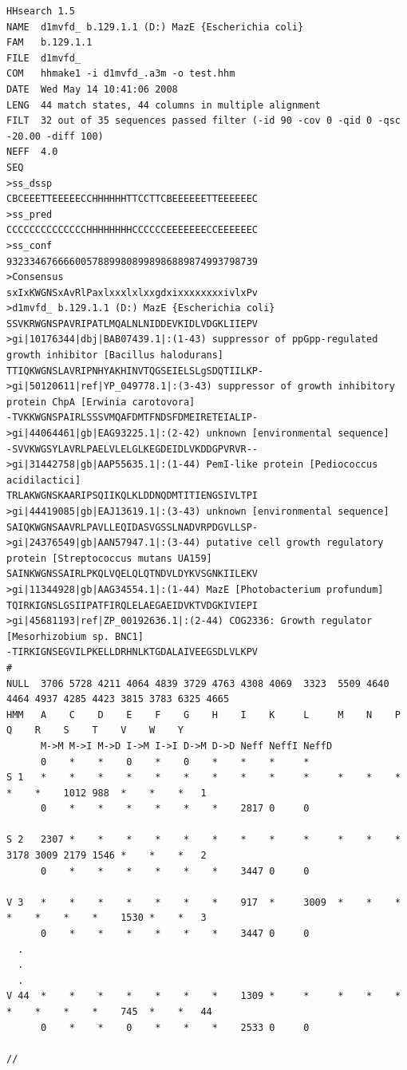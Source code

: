 \documentclass[11pt,a4paper]{article}
\begin{document}
\scriptsize
\begin{verbatim}
HHsearch 1.5
NAME  d1mvfd_ b.129.1.1 (D:) MazE {Escherichia coli}
FAM   b.129.1.1
FILE  d1mvfd_
COM   hhmake1 -i d1mvfd_.a3m -o test.hhm 
DATE  Wed May 14 10:41:06 2008
LENG  44 match states, 44 columns in multiple alignment
FILT  32 out of 35 sequences passed filter (-id 90 -cov 0 -qid 0 -qsc -20.00 -diff 100)
NEFF  4.0 
SEQ
>ss_dssp
CBCEEETTEEEEECCHHHHHHTTCCTTCBEEEEEETTEEEEEEC
>ss_pred
CCCCCCCCCCCCCCHHHHHHHHCCCCCCEEEEEEECCEEEEEEC
>ss_conf
93233467666600578899808998986889874993798739
>Consensus
sxIxKWGNSxAvRlPaxlxxxlxlxxgdxixxxxxxxxivlxPv
>d1mvfd_ b.129.1.1 (D:) MazE {Escherichia coli}
SSVKRWGNSPAVRIPATLMQALNLNIDDEVKIDLVDGKLIIEPV
>gi|10176344|dbj|BAB07439.1|:(1-43) suppressor of ppGpp-regulated growth inhibitor [Bacillus halodurans]
TTIQKWGNSLAVRIPNHYAKHINVTQGSEIELSLgSDQTIILKP-
>gi|50120611|ref|YP_049778.1|:(3-43) suppressor of growth inhibitory protein ChpA [Erwinia carotovora]
-TVKKWGNSPAIRLSSSVMQAFDMTFNDSFDMEIRETEIALIP-
>gi|44064461|gb|EAG93225.1|:(2-42) unknown [environmental sequence]
-SVVKWGSYLAVRLPAELVLELGLKEGDEIDLVKDDGPVRVR--
>gi|31442758|gb|AAP55635.1|:(1-44) PemI-like protein [Pediococcus acidilactici]
TRLAKWGNSKAARIPSQIIKQLKLDDNQDMTITIENGSIVLTPI
>gi|44419085|gb|EAJ13619.1|:(3-43) unknown [environmental sequence]
SAIQKWGNSAAVRLPAVLLEQIDASVGSSLNADVRPDGVLLSP-
>gi|24376549|gb|AAN57947.1|:(3-44) putative cell growth regulatory protein [Streptococcus mutans UA159]
SAINKWGNSSAIRLPKQLVQELQLQTNDVLDYKVSGNKIILEKV
>gi|11344928|gb|AAG34554.1|:(1-44) MazE [Photobacterium profundum]
TQIRKIGNSLGSIIPATFIRQLELAEGAEIDVKTVDGKIVIEPI
>gi|45681193|ref|ZP_00192636.1|:(2-44) COG2336: Growth regulator [Mesorhizobium sp. BNC1]
-TIRKIGNSEGVILPKELLDRHNLKTGDALAIVEEGSDLVLKPV
#
NULL  3706 5728 4211 4064 4839 3729 4763 4308 4069  3323  5509 4640 4464 4937 4285 4423 3815 3783 6325 4665
HMM   A    C    D    E    F    G    H    I    K     L     M    N    P    Q    R    S    T    V    W    Y
      M->M M->I M->D I->M I->I D->M D->D Neff NeffI NeffD
      0    *    *    0    *    0    *    *    *     *
S 1   *    *    *    *    *    *    *    *    *     *     *    *    *    *    *    1012 988  *    *    *   1
      0    *    *    *    *    *    *    2817 0     0

S 2   2307 *    *    *    *    *    *    *    *     *     *    *    *    3178 3009 2179 1546 *    *    *   2
      0    *    *    *    *    *    *    3447 0     0

V 3   *    *    *    *    *    *    *    917  *     3009  *    *    *    *    *    *    *    1530 *    *   3
      0    *    *    *    *    *    *    3447 0     0
  .
  .
  .
V 44  *    *    *    *    *    *    *    1309 *     *     *    *    *    *    *    *    *    745  *    *   44
      0    *    *    0    *    *    *    2533 0     0

//
\end{verbatim}
\normalsize
\end{document}
